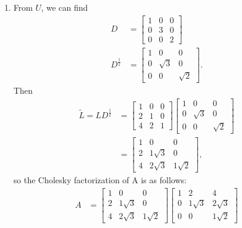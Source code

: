 \documentclass[12pt,letterpaper]{article}
\begin{document}
\begin{enumerate}
\begin{enumerate}
      \item From $U$, we can find
        \begin{align*}
          D &=
          \begin{bmatrix}
            1 & 0 & 0 \\
            0 & 3 & 0 \\
            0 & 0 & 2
          \end{bmatrix} \\
          D^{\frac12} &=
          \begin{bmatrix}
            1 & 0 & 0 \\
            0 & \sqrt{3} & 0 \\
            0 & 0 & \sqrt{2}
          \end{bmatrix}.
        \end{align*}
        Then
        \begin{align*}
          \tilde{L} = LD^{\frac12} &=
          \begin{bmatrix}
            1 & 0 & 0 \\
            2 & 1 & 0 \\
            4 & 2 & 1
          \end{bmatrix}
          \begin{bmatrix}
            1 & 0 & 0 \\
            0 & \sqrt{3} & 0 \\
            0 & 0 & \sqrt{2}
          \end{bmatrix} \\
          &=
          \begin{bmatrix}
            1 & 0 & 0 \\
            2 & 1\sqrt{3} & 0 \\
            4 & 2\sqrt{3} & 1\sqrt{2}
          \end{bmatrix},
        \end{align*}
        so the Cholesky factorization of A is as follows:
        \begin{align*}
          A &=
          \begin{bmatrix}
            1 & 0 & 0 \\
            2 & 1\sqrt{3} & 0 \\
            4 & 2\sqrt{3} & 1\sqrt{2}
          \end{bmatrix}
          \begin{bmatrix}
            1 & 2 & 4 \\
            0 & 1\sqrt{3} & 2\sqrt{3} \\
            0 & 0 & 1\sqrt{2}
          \end{bmatrix}
        \end{align*}
    \end{enumerate}
\end{enumerate}
\end{document}
